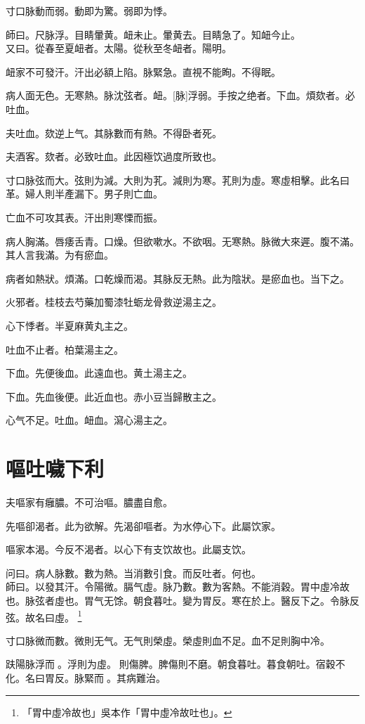 \documentclass[oneside,b4paper]{ctexbook}
\begin{document}
\begin{flushleft}
寸口脉動而弱。動即为驚。弱即为悸。

師曰。尺脉浮。目睛暈黄。衄未止。暈黄去。目睛急了。知衄今止。\\
又曰。從春至夏衄者。太陽。從秋至冬衄者。陽明。

衄家不可發汗。汗出必額上陷。脉緊急。直視不能眴。不得眠。

病人面无色。无寒熱。脉沈弦者。衄。[脉]浮弱。手按之绝者。下血。煩欬者。必吐血。

夫吐血。欬逆上气。其脉數而有熱。不得卧者死。

夫酒客。欬者。必致吐血。此因極饮過度所致也。

寸口脉弦而大。弦則为減。大則为芤。減則为寒。芤則为虛。寒虛相擊。此名曰革。婦人則半產漏下。男子則亡血。

亡血不可攻其表。汗出則寒慄而振。

病人胸滿。唇痿舌青。口燥。但欲嗽水。不欲咽。无寒熱。脉微大來遲。腹不滿。其人言我滿。为有瘀血。

病者如熱狀。煩滿。口乾燥而渴。其脉反无熱。此为陰狀。是瘀血也。当下之。

火邪者。桂枝去芍藥加蜀漆牡蛎龙骨救逆湯主之。

心下悸者。半夏麻黄丸主之。

吐血不止者。柏葉湯主之。

下血。先便後血。此遠血也。黄土湯主之。

下血。先血後便。此近血也。赤小豆当歸散主之。

心气不足。吐血。衄血。瀉心湯主之。

\chapter{嘔吐噦下利}

夫嘔家有癰膿。不可治嘔。膿盡自愈。

先嘔卻渴者。此为欲解。先渴卻嘔者。为水停心下。此屬饮家。

嘔家本渴。今反不渴者。以心下有支饮故也。此屬支饮。

问曰。病人脉數。數为熱。当消數引食。而反吐者。何也。\\
師曰。以發其汗。令陽微。膈气虛。脉乃數。數为客熱。不能消穀。胃中虛冷故也。脉弦者虛也。胃气无馀。朝食暮吐。變为胃反。寒在於上。醫反下之。令脉反弦。故名曰虛。
\footnote{「胃中虛冷故也」吳本作「胃中虛冷故吐也」。}

寸口脉微而數。微則无气。无气則榮虛。榮虛則血不足。血不足則胸中冷。

趺陽脉浮而{𬈧}。浮則为虛。{𬈧}則傷脾。脾傷則不磨。朝食暮吐。暮食朝吐。宿穀不化。名曰胃反。脉緊而{𬈧}。其病難治。


\end{flushleft}
\end{document}
